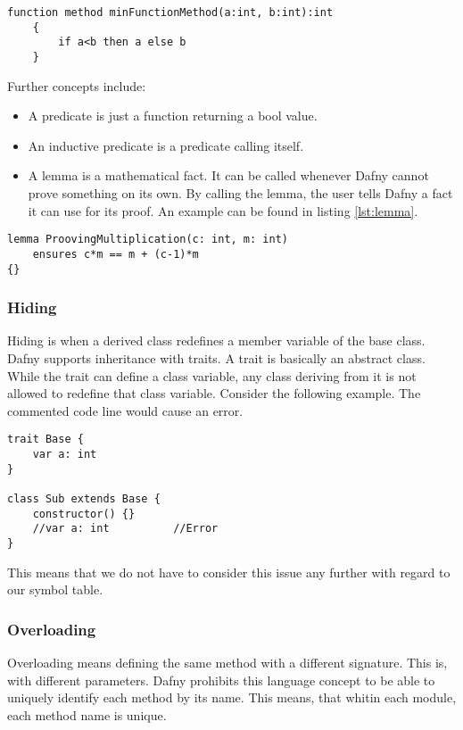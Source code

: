 \begin{lstlisting}[caption={Function}, captionpos=b, label={lst:function}]
    function method minFunctionMethod(a:int, b:int):int
    {
        if a<b then a else b
    }
\end{lstlisting}

Further concepts include:
\begin{itemize}
\item A predicate is just a function returning a bool value.
\item An inductive predicate is a predicate calling itself.
\item A lemma is a mathematical fact. It can be called whenever Dafny cannot prove something on its own. By calling the lemma, the user tells Dafny a fact it can use for its proof. An example can be found in listing \ref{lst:lemma}. \cite{dafnyReferenceManual}
\end{itemize}

\begin{lstlisting}[caption={Lemma}, captionpos=b, label={lst:lemma}]
lemma ProovingMultiplication(c: int, m: int)
    ensures c*m == m + (c-1)*m
{}
\end{lstlisting}

\subsubsection{Hiding}
Hiding is when a derived class redefines a member variable of the base class. Dafny supports inheritance with traits. A trait is basically an abstract class. While the trait can define a class variable, any class deriving from it is not allowed to redefine that class variable. Consider the following example. The commented code line would cause an error. \cite{dafnyReferenceManual}

\begin{lstlisting}[caption={Hiding}, captionpos=b, label={lst:hiding}]
trait Base {
    var a: int
}

class Sub extends Base {
    constructor() {}
    //var a: int          //Error
}
\end{lstlisting}

This means that we do not have to consider this issue any further with regard to our symbol table.

\subsubsection{Overloading}
Overloading means defining the same method with a different signature. This is, with different parameters. Dafny prohibits this language concept to be able to uniquely identify each method by its name. \cite{dafnyReferenceManual}
This means, that whitin each module, each method name is unique.

